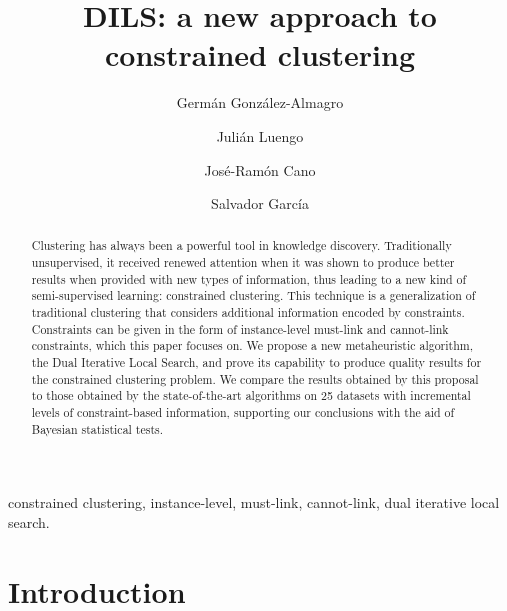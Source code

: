 \documentclass[review]{elsarticle}
\begin{document}
\begin{frontmatter}

\title{DILS: a new approach to constrained clustering}

\author[mymainaddress]{Germ\'an Gonz\'alez-Almagro}

\author[mymainaddress]{Juli\'an Luengo}

\author[mysecondaddress]{Jos\'e-Ram\'on Cano}

\author[mymainaddress]{Salvador Garc\'ia}

\address[mymainaddress]{DaSCI Andalusian Institute of Data Science and Computational Intelligence, University of Granada, Spain}

\address[mysecondaddress]{Dept. of Computer Science, EPS of Linares, University of Ja\'en, Campus Cient\'ifico Tecnol\'ogico de Linares, Cintur\'on Sur S/N, Linares 23700, Ja\'en, Spain}

\begin{abstract}
Clustering has always been a powerful tool in knowledge discovery. Traditionally unsupervised, it received renewed attention when it was shown to produce better results when provided with new types of information, thus leading to a new kind of semi-supervised learning: constrained clustering. This technique is a generalization of traditional clustering that considers additional information encoded by constraints. Constraints can be given in the form of instance-level
must-link and cannot-link constraints, which this paper focuses on. We propose a new metaheuristic algorithm, the Dual Iterative Local Search, and prove its capability to produce quality results for the constrained clustering problem. We compare the results obtained by this proposal to those obtained by the state-of-the-art algorithms on 25 datasets with incremental levels of constraint-based information, supporting our conclusions with the aid of Bayesian statistical tests.
\end{abstract}

\begin{keyword}
constrained clustering, instance-level, must-link, cannot-link, dual iterative local search.
\end{keyword}

\end{frontmatter}

\linenumbers

\section{Introduction} \label{sec:Intro}
\end{document}
